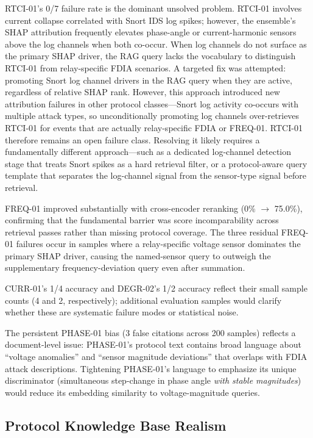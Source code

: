 \documentclass[twocolumn, 10pt, letterpaper]{article}
\begin{document}
RTCI-01's 0/7 failure rate is the dominant unsolved problem.
RTCI-01 involves current collapse correlated with Snort IDS log spikes;
however, the ensemble's SHAP attribution frequently elevates phase-angle or
current-harmonic sensors above the log channels when both co-occur.
When log channels do not surface as the primary SHAP driver, the RAG query
lacks the vocabulary to distinguish RTCI-01 from relay-specific FDIA scenarios.
A targeted fix was attempted: promoting Snort log channel drivers in the RAG
query when they are active, regardless of relative SHAP rank.
However, this approach introduced new attribution failures in other protocol
classes---Snort log activity co-occurs with multiple attack types, so
unconditionally promoting log channels over-retrieves RTCI-01 for events that
are actually relay-specific FDIA or FREQ-01.
RTCI-01 therefore remains an open failure class.
Resolving it likely requires a fundamentally different approach---such as a
dedicated log-channel detection stage that treats Snort spikes as a hard
retrieval filter, or a protocol-aware query template that separates the
log-channel signal from the sensor-type signal before retrieval.

FREQ-01 improved substantially with cross-encoder reranking (0\% $\to$ 75.0\%),
confirming that the fundamental barrier was score incomparability across retrieval
passes rather than missing protocol coverage.
The three residual FREQ-01 failures occur in samples where a relay-specific
voltage sensor dominates the primary SHAP driver, causing the named-sensor query
to outweigh the supplementary frequency-deviation query even after summation.

CURR-01's 1/4 accuracy and DEGR-02's 1/2 accuracy reflect their small sample
counts (4 and 2, respectively); additional evaluation samples would clarify whether
these are systematic failure modes or statistical noise.

The persistent PHASE-01 bias (3 false citations across 200 samples) reflects
a document-level issue: PHASE-01's protocol text contains broad language about
``voltage anomalies'' and ``sensor magnitude deviations'' that overlaps with
FDIA attack descriptions.
Tightening PHASE-01's language to emphasize its unique discriminator
(simultaneous step-change in phase angle \textit{with stable magnitudes})
would reduce its embedding similarity to voltage-magnitude queries.

\subsection{Protocol Knowledge Base Realism}
\end{document}
